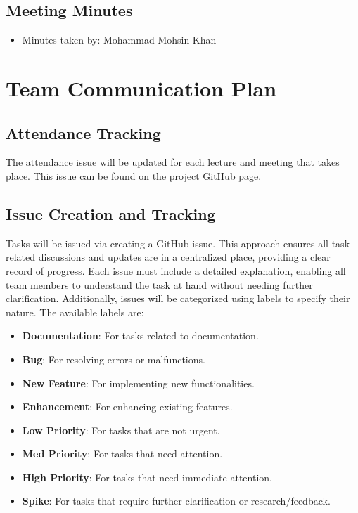 \documentclass{article}
\begin{document}
\subsection*{Meeting Minutes}

\begin{itemize}
    \item Minutes taken by: Mohammad Mohsin Khan
\end{itemize}



\section{Team Communication Plan}

\subsection{Attendance Tracking}

The attendance issue will be updated for each lecture and meeting that takes place. This issue 
can be found on the project GitHub page.

\subsection{Issue Creation and Tracking}

Tasks will be issued via creating a GitHub issue. This approach ensures all task-related 
discussions and updates are in a centralized place, providing a clear record of progress. 
Each issue must include a detailed explanation, enabling all team members to understand the 
task at hand without needing further clarification. Additionally, issues will be categorized 
using labels to specify their nature. The available labels are:

\begin{itemize}
    \item \textbf{Documentation}: For tasks related to documentation.
    \item \textbf{Bug}: For resolving errors or malfunctions.
    \item \textbf{New Feature}: For implementing new functionalities.
    \item \textbf{Enhancement}: For enhancing existing features.
    \item \textbf{Low Priority}: For tasks that are not urgent.
    \item \textbf{Med Priority}: For tasks that need attention.
    \item \textbf{High Priority}: For tasks that need immediate attention.
    \item \textbf{Spike}: For tasks that require further clarification or research/feedback.
\end{itemize}
\end{document}
